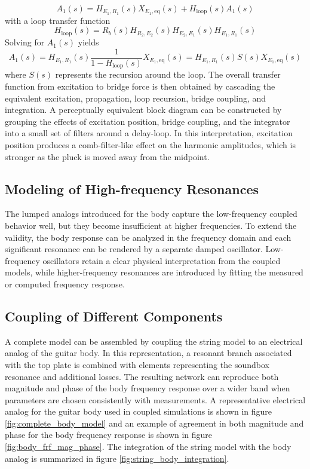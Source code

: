 \[
A_1(s)=H_{E_1,R_1}(s)X_{E_1,\mathrm{eq}}(s)+H_{\mathrm{loop}}(s)A_1(s)
\]
with a loop transfer function
\[
H_{\mathrm{loop}}(s)=R_b(s)H_{R_2,E_2}(s)H_{E_2,E_1}(s)H_{E_1,R_1}(s)
\]
Solving for \( A_1(s) \) yields
\[
A_1(s)=H_{E_1,R_1}(s)\frac{1}{1-H_{\mathrm{loop}}(s)}X_{E_1,\mathrm{eq}}(s)
=
H_{E_1,R_1}(s)S(s)X_{E_1,\mathrm{eq}}(s)
\]
where \( S(s) \) represents the recursion around the loop. The overall transfer function from excitation to bridge force is then obtained by cascading the equivalent excitation, propagation, loop recursion, bridge coupling, and integration. A perceptually equivalent block diagram can be constructed by grouping the effects of excitation position, bridge coupling, and the integrator into a small set of filters around a delay-loop. In this interpretation, excitation position produces a comb-filter-like effect on the harmonic amplitudes, which is stronger as the pluck is moved away from the midpoint.

\subsection{Modeling of High-frequency Resonances}

The lumped analogs introduced for the body capture the low-frequency coupled behavior well, but they become insufficient at higher frequencies. To extend the validity, the body response can be analyzed in the frequency domain and each significant resonance can be rendered by a separate damped oscillator. Low-frequency oscillators retain a clear physical interpretation from the coupled models, while higher-frequency resonances are introduced by fitting the measured or computed frequency response.

\subsection{Coupling of Different Components}

A complete model can be assembled by coupling the string model to an electrical analog of the guitar body. In this representation, a resonant branch associated with the top plate is combined with elements representing the soundbox resonance and additional losses. The resulting network can reproduce both magnitude and phase of the body frequency response over a wider band when parameters are chosen consistently with measurements. A representative electrical analog for the guitar body used in coupled simulations is shown in figure \ref{fig:complete_body_model} and an example of agreement in both magnitude and phase for the body frequency response is shown in figure \ref{fig:body_frf_mag_phase}. The integration of the string model with the body analog is summarized in figure \ref{fig:string_body_integration}.

